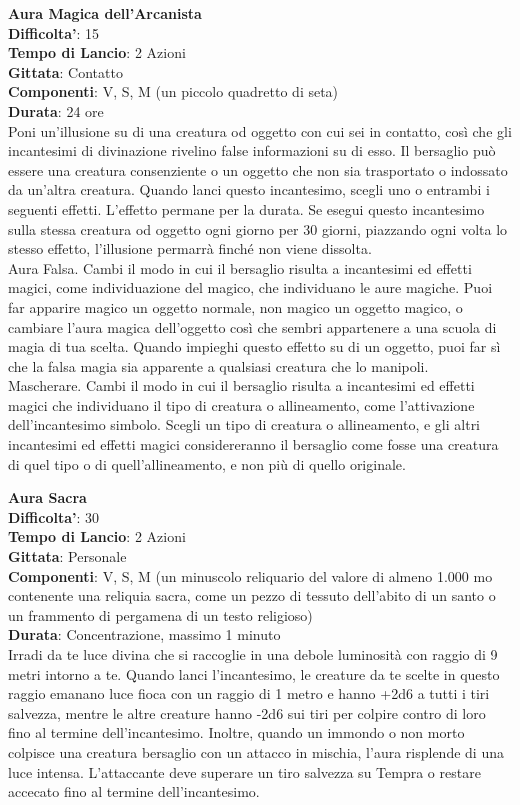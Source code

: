 \begin{multicols}{2}
\medskip\textbf{Aura Magica dell’Arcanista}\\
\textbf{Difficolta'}: 15\\
\textbf{Tempo di Lancio}: 2 Azioni\\
\textbf{Gittata}: Contatto\\
\textbf{Componenti}: V, S, M (un piccolo quadretto di seta)\\
\textbf{Durata}: 24 ore\\
Poni un’illusione su di una creatura od oggetto con cui sei in contatto, così che gli incantesimi di divinazione rivelino false informazioni su di esso. Il bersaglio può essere una creatura consenziente o un oggetto che non sia trasportato o indossato da un’altra creatura. Quando lanci questo incantesimo, scegli uno o entrambi i seguenti effetti. L’effetto permane per la durata. Se esegui questo incantesimo sulla stessa creatura od oggetto ogni giorno per 30 giorni, piazzando ogni volta lo stesso effetto, l’illusione permarrà finché non viene dissolta.\\
Aura Falsa. Cambi il modo in cui il bersaglio risulta a incantesimi ed effetti magici, come individuazione del magico, che individuano le aure magiche. Puoi far apparire magico un oggetto normale, non magico un oggetto magico, o cambiare l’aura magica dell’oggetto così che sembri appartenere a una scuola di magia di tua scelta. Quando impieghi questo effetto su di un oggetto, puoi far sì che la falsa magia sia apparente a qualsiasi creatura che lo manipoli.\\ Mascherare. Cambi il modo in cui il bersaglio risulta a incantesimi ed effetti magici che individuano il tipo di creatura o allineamento, come l’attivazione dell’incantesimo simbolo. Scegli un tipo di creatura o allineamento, e gli altri incantesimi ed effetti magici considereranno il bersaglio come fosse una creatura di quel tipo o di quell’allineamento, e non più di quello originale.


\medskip\textbf{Aura Sacra}\\
\textbf{Difficolta'}: 30\\
\textbf{Tempo di Lancio}: 2 Azioni\\
\textbf{Gittata}: Personale\\
\textbf{Componenti}: V, S, M (un minuscolo reliquario del valore di almeno 1.000 mo contenente una reliquia sacra, come un pezzo di tessuto dell’abito di un santo o un frammento di pergamena di un testo religioso)\\
\textbf{Durata}: Concentrazione, massimo 1 minuto\\
Irradi da te luce divina che si raccoglie in una debole luminosità con raggio di 9 metri intorno a te. Quando lanci l’incantesimo, le creature da te scelte in questo raggio emanano luce fioca con un raggio di 1 metro e hanno {+2d6} a tutti i tiri salvezza, mentre le altre creature hanno {-2d6} sui tiri per colpire contro di loro fino al termine dell’incantesimo. Inoltre, quando un immondo o non morto colpisce una creatura bersaglio con un attacco in mischia, l’aura risplende di una luce intensa. L’attaccante deve superare un tiro salvezza su Tempra o restare accecato fino al termine dell’incantesimo.


\end{multicols}
